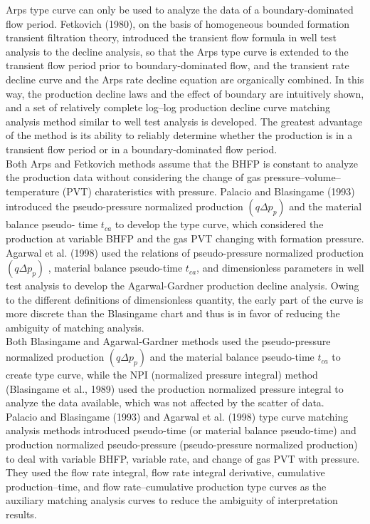 \documentclass[12pt,a4paper]{report}
\begin{document}
Arps type curve can only be used to analyze the data of a boundary-dominated flow period. Fetkovich (1980), on the basis of homogeneous bounded formation transient filtration theory, introduced the transient flow formula in well test analysis to the decline analysis, so that the Arps type curve is extended to the transient flow period prior to boundary-dominated flow, and the transient rate decline curve and the Arps rate decline equation are organically combined. In this way, the production decline laws and the effect of boundary are intuitively shown, and a set of relatively complete log–log production decline curve matching analysis method similar to well test analysis is developed. The greatest advantage of the method is its ability to reliably determine whether the production is in a transient flow period or in a boundary-dominated flow period.\\
Both Arps and Fetkovich methods assume that the BHFP is constant to analyze the production data without considering the change of gas pressure–volume–temperature (PVT) charateristics with pressure. Palacio and Blasingame (1993) introduced the pseudo-pressure normalized production $(q\Delta p_{p})$ and the material balance pseudo- time $t_{ca}$ to develop the type curve, which considered the production at variable BHFP and the gas PVT changing with formation pressure.\\
Agarwal et al. (1998) used the relations of pseudo-pressure normalized production $(q\Delta p_{p})$ , material balance pseudo-time $t_{ca}$, and dimensionless parameters in well test analysis to develop the Agarwal-Gardner production decline analysis. Owing to the different definitions of dimensionless quantity, the early part of the curve is more discrete than the Blasingame chart and thus is in favor of reducing the ambiguity of matching analysis.\\
Both Blasingame and Agarwal-Gardner methods used the pseudo-pressure normalized production $(q\Delta p_{p})$ and the material balance pseudo-time $t_{ca}$ to create type curve, while the NPI (normalized pressure integral) method (Blasingame et al., 1989) used the production normalized pressure integral to analyze the data available, which was not affected by the scatter of data.\\
Palacio and Blasingame (1993) and Agarwal et al. (1998) type curve matching analysis methods introduced pseudo-time (or material balance pseudo-time) and production normalized pseudo-pressure (pseudo-pressure normalized production) to deal with variable BHFP, variable rate, and change of gas PVT with pressure. They used the flow rate integral, flow rate integral derivative, cumulative production–time, and flow rate–cumulative production type curves as the auxiliary matching analysis curves to reduce the ambiguity of interpretation results.\\
\end{document}
